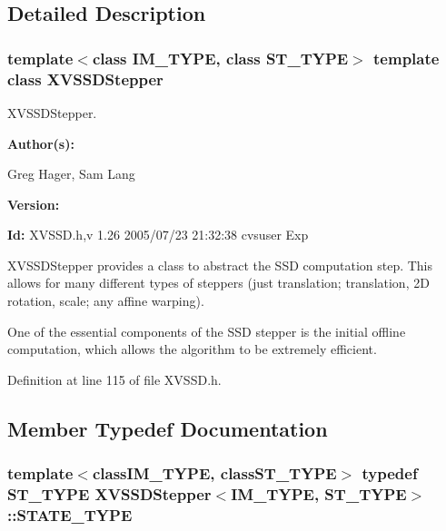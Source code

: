 \subsection{Detailed Description}
\subsubsection*{template$<$class IM\_\-TYPE, class ST\_\-TYPE$>$  template class XVSSDStepper}

XVSSDStepper.

\begin{Desc}
\item[{\bf Author(s): }]\par
 Greg Hager, Sam Lang \end{Desc}
\begin{Desc}
\item[{\bf Version: }]\par
 \end{Desc}
\begin{Desc}
\item[{\bf Id: }] XVSSD.h,v 1.26 2005/07/23 21:32:38 cvsuser Exp \end{Desc}


XVSSDStepper provides a class to abstract the SSD computation step. This allows for many different types of steppers (just translation; translation, 2D rotation, scale; any affine warping).

One of the essential components of the SSD stepper is the initial offline computation, which allows  the algorithm to be extremely efficient. 



Definition at line 115 of file XVSSD.h.

\subsection{Member Typedef Documentation}
\label{XVSSDStepper_s0}
\hypertarget{class_XVSSDStepper_s0}{
\subsubsection[STATE_TYPE]{\setlength{\rightskip}{0pt plus 5cm}template$<$classIM\_\-TYPE, classST\_\-TYPE$>$ typedef ST\_\-TYPE XVSSDStepper$<$IM\_\-TYPE, ST\_\-TYPE$>$::STATE\_\-TYPE}}




